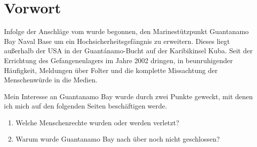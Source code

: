 \section{Vorwort}
Infolge der Anschläge vom  wurde begonnen, den Marinestützpunkt Guantanamo
Bay Naval Base um ein Hochsicherheitsgefängnis zu erweitern. Dieses liegt außerhalb
der USA in der Guantánamo-Bucht auf der Karibikinsel Kuba. Seit der Errichtung des Gefangenenlagers
im Jahre 2002 dringen, in beunruhigender Häufigkeit, Meldungen über Folter
und die komplette Missachtung der Menschenwürde in die Medien.

Mein Interesse an Guantanamo Bay wurde durch zwei Punkte geweckt,
mit denen ich mich auf den folgenden Seiten beschäftigen werde.
\begin{enumerate}
	\item Welche Menschenrechte wurden oder werden verletzt?
	\item Warum wurde Guantanamo Bay nach über  noch nicht
		geschlossen?
\end{enumerate}
